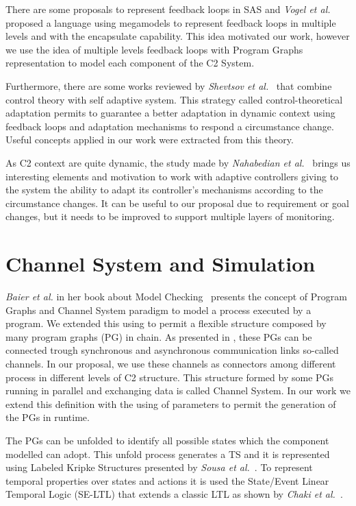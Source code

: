 There are some proposals to represent feedback loops in SAS and \textit{Vogel et al.}~\cite{SAS05} proposed a language using megamodels to represent feedback loops in multiple levels and with the encapsulate capability. This idea motivated our work, however we use the idea of multiple levels feedback loops with Program Graphs representation to model each component of the C2 System.

Furthermore, there are some works reviewed by \textit{Shevtsov et al.}~\cite{SAS100-02} that combine control theory with self adaptive system. This strategy called control-theoretical adaptation permits to guarantee a better adaptation in dynamic context using feedback loops and adaptation mechanisms to respond a circumstance change. Useful concepts applied in our work were extracted from this theory.

As C2 context are quite dynamic, the study made by \textit{Nahabedian et al.}~\cite{DSPL100-03} brings us interesting elements and motivation to work with adaptive controllers giving to the system the ability to adapt its controller's mechanisms according to the circumstance changes. It can be useful to our proposal due to requirement or goal changes, but it needs to be improved to support multiple layers of monitoring.



\section{Channel System and Simulation}

\textit{Baier et al.} in her book about Model Checking~\cite{baier} presents the concept of Program Graphs and Channel System paradigm to model a process executed by a program. We extended this using to permit a flexible structure composed by many program graphs (PG) in chain. As presented in \cite{baier}, these PGs can be connected trough synchronous and asynchronous communication links so-called channels. In our proposal, we use these channels as connectors among different process in different levels of C2 structure. This structure formed by some PGs running in parallel and exchanging data is called Channel System. In our work we extend this definition with the using of parameters to permit the generation of the PGs in runtime.

The PGs can be unfolded to identify all possible states which the component modelled can adopt. This unfold process generates a TS and it is represented using Labeled Kripke Structures presented by \textit{Sousa et al.}~\cite{ltl02}. To represent temporal properties over states and actions it is used the State/Event Linear Temporal Logic (SE-LTL) that extends a classic LTL as shown by \textit{Chaki et al.}~\cite{ltl01}.

